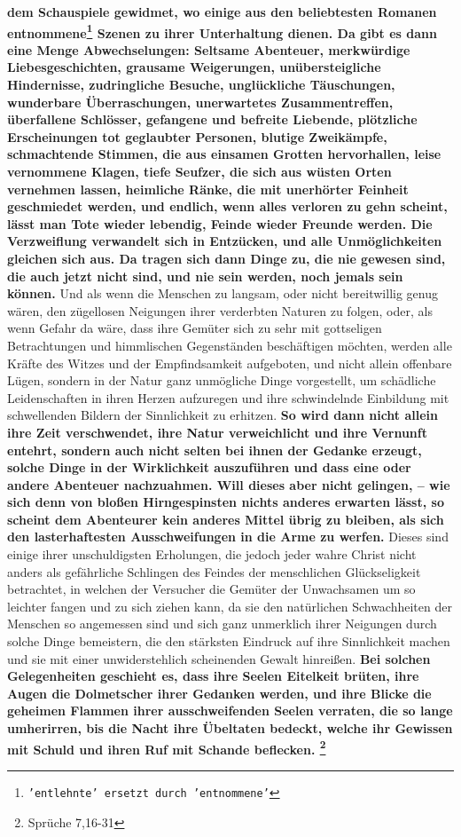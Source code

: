 \textbf{dem Schauspiele
gewidmet, wo einige aus den beliebtesten Romanen entnommene\footnote{\texttt{'entlehnte' ersetzt durch 'entnommene'}} Szenen zu ihrer
Unterhaltung dienen. Da gibt es dann eine Menge Abwechselungen: Seltsame
Abenteuer, merkwürdige Liebesgeschichten, grausame Weigerungen,
unübersteigliche Hindernisse, zudringliche Besuche, unglückliche Täuschungen,
wunderbare Überraschungen, unerwartetes Zusammentreffen, überfallene Schlösser,
gefangene und befreite Liebende, plötzliche Erscheinungen tot geglaubter
Personen, blutige Zweikämpfe, schmachtende Stimmen, die aus einsamen Grotten
hervorhallen, leise vernommene Klagen, tiefe Seufzer, die sich aus wüsten
Orten vernehmen lassen, heimliche Ränke, die mit unerhörter Feinheit
geschmiedet werden, und endlich, wenn alles verloren zu gehn scheint, lässt man
Tote wieder lebendig, Feinde wieder Freunde werden. Die Verzweiflung verwandelt
sich in Entzücken, und alle Unmöglichkeiten gleichen sich aus. Da tragen sich
dann Dinge zu, die nie gewesen sind, die auch jetzt nicht sind, und nie sein
werden, noch jemals sein können.} Und als wenn die Menschen zu langsam, oder
nicht bereitwillig genug wären, den zügellosen Neigungen ihrer verderbten
Naturen zu folgen, oder, als wenn Gefahr da wäre, dass ihre Gemüter sich zu sehr
mit gottseligen Betrachtungen und himmlischen Gegenständen beschäftigen möchten,
werden alle Kräfte des Witzes und der Empfindsamkeit aufgeboten, und nicht allein
offenbare Lügen, sondern in der Natur ganz unmögliche Dinge vorgestellt, um
schädliche Leidenschaften in ihren Herzen aufzuregen und ihre schwindelnde
Einbildung mit schwellenden Bildern der Sinnlichkeit zu erhitzen.
\label{ref:17_01_schauspiel_2}
\textbf{So wird dann
nicht allein ihre Zeit verschwendet, ihre Natur verweichlicht und ihre Vernunft
entehrt, sondern auch nicht selten bei ihnen der Gedanke erzeugt, solche Dinge
in der Wirklichkeit auszuführen und dass eine oder andere Abenteuer nachzuahmen.
Will dieses aber nicht gelingen, -- wie sich denn von bloßen Hirngespinsten
nichts anderes erwarten lässt, so scheint dem Abenteurer kein anderes Mittel übrig
zu bleiben, als sich den lasterhaftesten Ausschweifungen in die Arme zu werfen.}
Dieses sind einige ihrer unschuldigsten Erholungen, die jedoch jeder wahre
Christ nicht anders als gefährliche Schlingen des Feindes der menschlichen
Glückseligkeit betrachtet, in welchen der Versucher die Gemüter der Unwachsamen
um so leichter fangen und zu sich ziehen kann, da sie den natürlichen
Schwachheiten der Menschen so angemessen sind und sich ganz unmerklich ihrer
Neigungen durch solche Dinge bemeistern, die den stärksten Eindruck auf ihre
Sinnlichkeit machen und sie mit einer unwiderstehlich scheinenden Gewalt
hinreißen. \textbf{Bei solchen Gelegenheiten geschieht es, dass ihre Seelen
Eitelkeit
brüten, ihre Augen die Dolmetscher ihrer Gedanken werden, und ihre Blicke die
geheimen Flammen ihrer ausschweifenden Seelen verraten, die so lange
umherirren, bis die Nacht ihre Übeltaten bedeckt, welche ihr Gewissen mit
Schuld und ihren Ruf mit Schande beflecken.
\footnote{Sprüche 7,16-31}}

